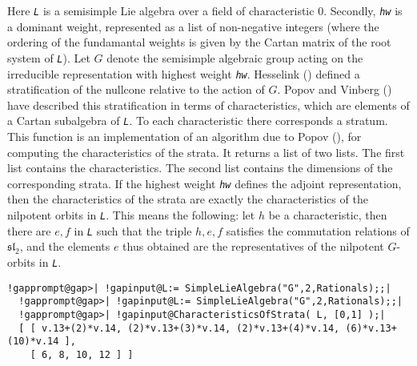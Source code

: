 \documentclass[a4paper,11pt]{report}
\begin{document}
{{{ Here \mbox{\texttt{\mdseries\slshape L}} is a semisimple Lie algebra over a field of characteristic 0. Secondly, \mbox{\texttt{\mdseries\slshape hw}} is a dominant weight, represented as a list of non-negative integers (where
the ordering of the fundamantal weights is given by the Cartan matrix of the
root system of \mbox{\texttt{\mdseries\slshape L}}). Let $G$ denote the semisimple algebraic group acting on the irreducible representation
with highest weight \mbox{\texttt{\mdseries\slshape hw}}. Hesselink (\cite{hesselink}) defined a stratification of the nullcone relative to the action of $G$. Popov and Vinberg (\cite{povin}) have described this stratification in terms of characteristics, which are
elements of a Cartan subalgebra of \mbox{\texttt{\mdseries\slshape L}}. To each characteristic there corresponds a stratum. This function is an
implementation of an algorithm due to Popov (\cite{popov}), for computing the characteristics of the strata. It returns a list of two
lists. The first list contains the characteristics. The second list contains
the dimensions of the corresponding strata. If the highest weight \mbox{\texttt{\mdseries\slshape hw}} defines the adjoint representation, then the characteristics of the strata are
exactly the characteristics of the nilpotent orbits in \mbox{\texttt{\mdseries\slshape L}}. This means the following: let $h$ be a characteristic, then there are $e,f$ in \mbox{\texttt{\mdseries\slshape L}} such that the triple $h,e,f$ satisfies the commutation relations of $\mathfrak{sl}_2$, and the elements $e$ thus obtained are the representatives of the nilpotent $G$-orbits in \mbox{\texttt{\mdseries\slshape L}}. 
\begin{Verbatim}[commandchars=!@|,fontsize=\small,frame=single,label=Example]
  !gapprompt@gap>| !gapinput@L:= SimpleLieAlgebra("G",2,Rationals);;|
  !gapprompt@gap>| !gapinput@L:= SimpleLieAlgebra("G",2,Rationals);;|
  !gapprompt@gap>| !gapinput@CharacteristicsOfStrata( L, [0,1] );|
  [ [ v.13+(2)*v.14, (2)*v.13+(3)*v.14, (2)*v.13+(4)*v.14, (6)*v.13+(10)*v.14 ],
    [ 6, 8, 10, 12 ] ]
\end{Verbatim}
 }

 }

 }

 
\end{document}
